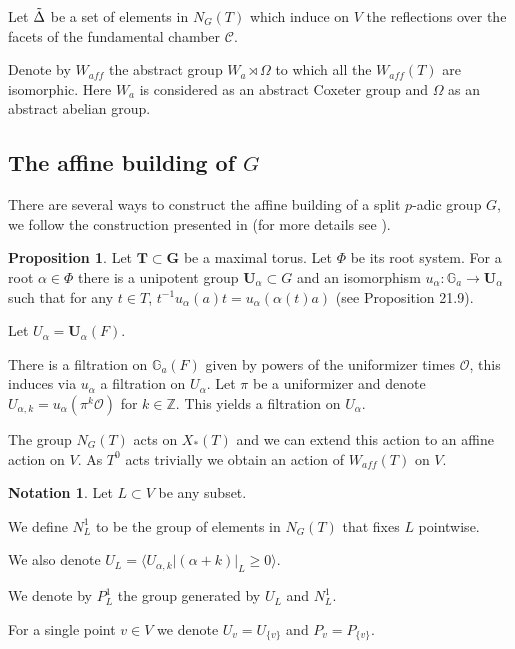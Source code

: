 \documentclass[12pt]{article}
\newcommand{\C}{\mathcal{C}}
\newcommand{\s}{\mathcal{O}}
\newcommand{\<}{\langle}
\renewcommand{\>}{\rangle}
\theoremstyle{plain}
\theoremstyle{definition}
\newtheorem{prop}[theorem]{Proposition}
\newtheorem{Not}[theorem]{Notation}
\begin{document}
Let $\Tilde{\Delta}$ be a set of elements in $N_G(T)$ which induce on $V$ the reflections over the facets of the fundamental chamber $\C$.

Denote by $W_{aff}$ the abstract group $W_{a}\rtimes \Omega$ to which all the $W_{aff}(T)$ are isomorphic. Here $W_{a}$ is considered as an abstract Coxeter group and $\Omega$ as an abstract abelian group.



\subsection{The affine building of $G$}
\label{2.2}
There are several ways to construct the affine building of a split $p$-adic group $G$, we follow the construction presented in \cite{delorm} (for more details see \cite{Landvogt1995ACO}).

\begin{prop}\label{2.4}
Let $\mathbf{T}\subset \mathbf{G}$ be a maximal torus. Let $\Phi$ be its root system.
For a root $\alpha\in \Phi$ there is a unipotent group $\mathbf{U}_\alpha\subset G$ and an isomorphism $u_\alpha:\mathbb{G}_a\rightarrow \mathbf{U}_\alpha$ such that for any $t\in T$, $t^{-1}u_\alpha(a)t=u_\alpha(\alpha(t)a)$ (see \cite{LAG} Proposition 21.9).
\end{prop}

Let $U_\alpha=\mathbf{U}_\alpha(F)$.

There is a filtration on $\mathbb{G}_a(F)$ given by powers of the uniformizer times $\s$, this induces via $u_\alpha$ a filtration on $U_\alpha$. Let $\pi$ be a uniformizer and denote $U_{\alpha,k}=u_\alpha(\pi^k\s)$ for $k\in \mathbb{Z}$. This yields a filtration on $U_\alpha$.


The group $N_G(T)$ acts on $X_*(T)$ and we can extend this action to an affine action on $V$. As $T^0$ acts trivially we obtain an action of $W_{aff}(T)$ on $V$.

\begin{Not}\label{2.7}
    Let $L\subset V$ be any subset.
    
    We define $N^1_L$ to be the group of elements in $N_G(T)$ that fixes $L$ pointwise.
    
    We also denote $U_L=\Big \langle U_{\alpha,k}\Big|(\alpha+k)|_L\geq 0\Big \rangle$.
    
    We denote by $P^1_L$ the group generated by $U_L$ and $N^1_L$. 
    
    For a single point $v\in V$ we denote $U_v=U_{\{v\}}$ and $P_v=P_{\{v\}}$.
    
\end{Not}
\end{document}
